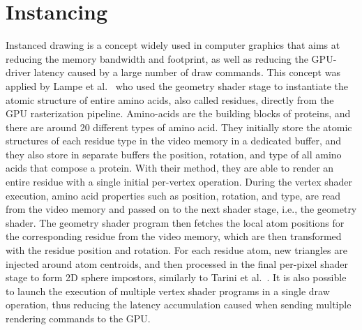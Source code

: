 \section{Instancing}

Instanced drawing is a concept widely used in computer graphics that aims at reducing the memory bandwidth and footprint, as well as reducing the GPU-driver latency caused by a large number of draw commands.
This concept was applied by Lampe et al.~\cite{lampe2007two} who used the geometry shader stage to instantiate the atomic structure of entire amino acids, also called residues, directly from the GPU rasterization pipeline.
Amino-acids are the building blocks of proteins, and there are around 20 different types of amino acid.
They initially store the atomic structures of each residue type in the video memory in a dedicated buffer, and they also store in separate buffers the position, rotation, and type of all amino acids that compose a protein.
With their method, they are able to render an entire residue with a single initial per-vertex operation.
During the vertex shader execution, amino acid properties such as position, rotation, and type, are read from the video memory and passed on to the next shader stage, i.e., the geometry shader.
The geometry shader program then fetches the local atom positions for the corresponding residue from the video memory, which are then transformed with the residue position and rotation.
For each residue atom, new triangles are injected around atom centroids, and then processed in the final per-pixel shader stage to form 2D sphere impostors, similarly to Tarini et al.~\cite{tarini2006ambient}.
It is also possible to launch the execution of multiple vertex shader programs in a single draw operation, thus reducing the latency accumulation caused when sending multiple rendering commands to the GPU. 

